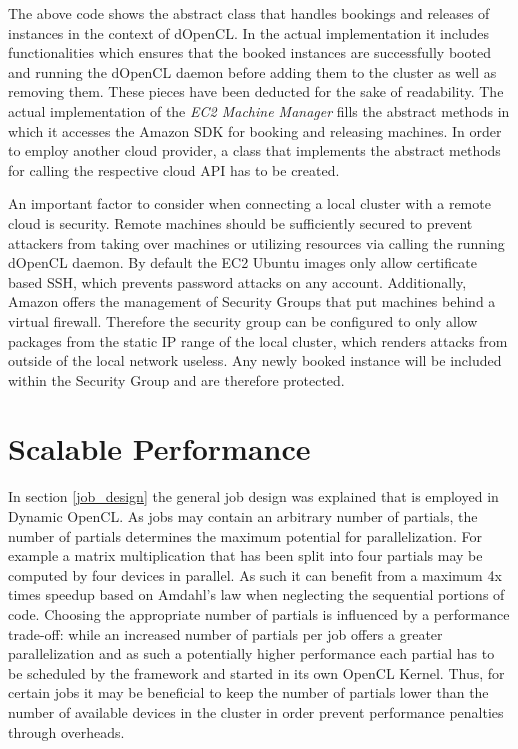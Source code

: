 The above code shows the abstract class that handles bookings and releases of instances in the context of dOpenCL. In the actual implementation it includes functionalities which ensures that the booked instances are successfully booted and running the dOpenCL daemon before adding them to the cluster as well as removing them. These pieces have been deducted for the sake of readability. The actual implementation of the \textit{EC2 Machine Manager} fills the abstract methods in which it accesses the Amazon SDK for booking and releasing machines. In order to employ another cloud provider, a class that implements the abstract methods for calling the respective cloud API has to be created.

An important factor to consider when connecting a local cluster with a remote cloud is security. Remote machines should be sufficiently secured to prevent attackers from taking over machines or utilizing resources via calling the running dOpenCL daemon. By default the EC2 Ubuntu images only allow certificate based SSH, which prevents password attacks on any account. Additionally, Amazon offers the management of Security Groups that put machines behind a virtual firewall. Therefore the security group can be configured to only allow packages from the static IP range of the local cluster, which renders attacks from outside of the local network useless. Any newly booked instance will be included within the Security Group and are therefore protected.

\section{Scalable Performance}

In section \ref{job_design} the general job design was explained that is employed in Dynamic OpenCL. As jobs may contain an arbitrary number of partials, the number of partials determines the maximum potential for parallelization. For example a matrix multiplication that has been split into four partials may be computed by four devices in parallel. As such it can benefit from a maximum 4x times speedup based on Amdahl's law\cite{amdahl} when neglecting the sequential portions of code. Choosing the appropriate number of partials is influenced by a performance trade-off: while an increased number of partials per job offers a greater parallelization and as such a potentially higher performance each partial has to be scheduled by the framework and started in its own OpenCL Kernel. Thus, for certain jobs it may be beneficial to keep the number of partials lower than the number of available devices in the cluster in order prevent performance penalties through overheads.

